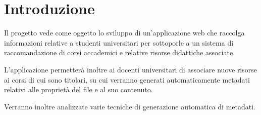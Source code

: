 %
\chapter*{Introduzione}                 %

Il progetto vede come oggetto lo sviluppo di un'applicazione web che raccolga informazioni relative a studenti universitari per sottoporle a un sistema di raccomandazione di corsi accademici e relative risorse didattiche associate.

\vspace{5mm}

L'applicazione permetterà inoltre ai docenti universitari di associare nuove risorse ai corsi di cui sono titolari, su cui verranno generati automaticamente metadati relativi alle proprietà del file e al suo contenuto.

\vspace{5mm}

Verranno inoltre analizzate varie tecniche di generazione automatica di metadati.

\clearpage{\pagestyle{empty}\cleardoublepage}